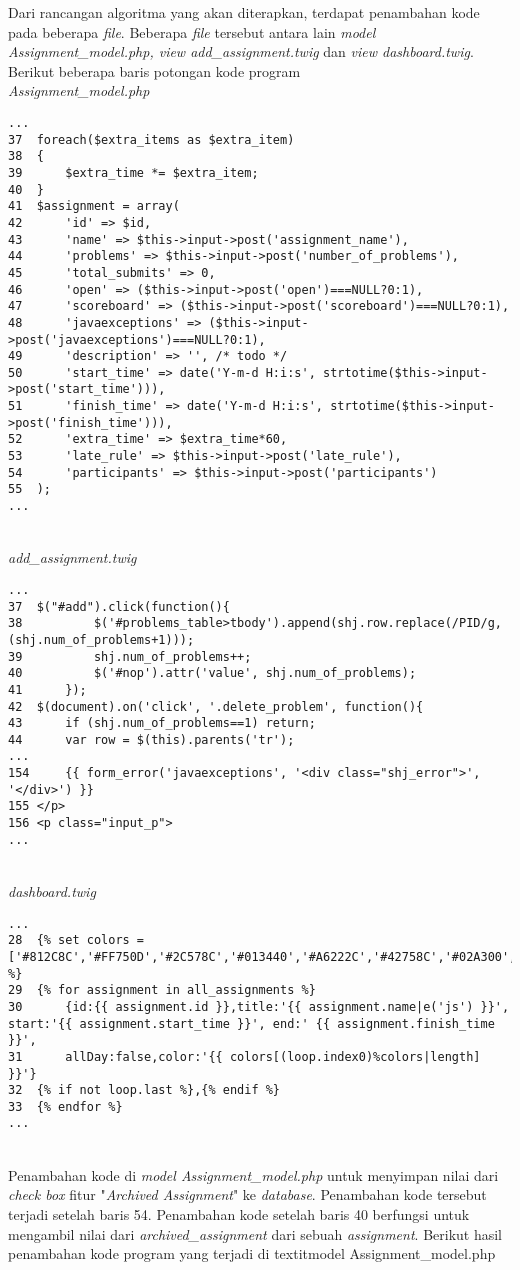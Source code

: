 Dari rancangan algoritma yang akan diterapkan, terdapat penambahan kode pada beberapa \textit{file}. Beberapa \textit{file} tersebut antara lain \textit{model Assignment\_model.php, view add\_assignment.twig} dan \textit{view dashboard.twig}.
Berikut beberapa baris potongan kode program
~\\
\textit{Assignment\_model.php}
\begin{lstlisting}[basicstyle=\ttfamily, frame=single,
columns=fullflexible, keepspaces=true, breaklines=true]
...
37	foreach($extra_items as $extra_item)
38	{
39		$extra_time *= $extra_item;
40	}
41	$assignment = array(
42		'id' => $id,
43		'name' => $this->input->post('assignment_name'),
44		'problems' => $this->input->post('number_of_problems'),
45		'total_submits' => 0,
46		'open' => ($this->input->post('open')===NULL?0:1),
47		'scoreboard' => ($this->input->post('scoreboard')===NULL?0:1),
48		'javaexceptions' => ($this->input->post('javaexceptions')===NULL?0:1),
49		'description' => '', /* todo */
50		'start_time' => date('Y-m-d H:i:s', strtotime($this->input->post('start_time'))),
51		'finish_time' => date('Y-m-d H:i:s', strtotime($this->input->post('finish_time'))),
52		'extra_time' => $extra_time*60,
53		'late_rule' => $this->input->post('late_rule'),
54		'participants' => $this->input->post('participants')
55	);
...
\end{lstlisting}
~\\
\textit{add\_assignment.twig}
\begin{lstlisting}[basicstyle=\ttfamily, frame=single,
columns=fullflexible, keepspaces=true, breaklines=true]
...
37	$("#add").click(function(){
38			$('#problems_table>tbody').append(shj.row.replace(/PID/g, (shj.num_of_problems+1)));
39			shj.num_of_problems++;
40			$('#nop').attr('value', shj.num_of_problems);
41		});
42	$(document).on('click', '.delete_problem', function(){
43		if (shj.num_of_problems==1) return;
44		var row = $(this).parents('tr');
...
154		{{ form_error('javaexceptions', '<div class="shj_error">', '</div>') }}
155	</p>
156	<p class="input_p">
...
\end{lstlisting}
~\\
\textit{dashboard.twig}
\begin{lstlisting}[basicstyle=\ttfamily, frame=single,
columns=fullflexible, keepspaces=true, breaklines=true]
...
28	{% set colors = ['#812C8C','#FF750D','#2C578C','#013440','#A6222C','#42758C','#02A300','#BA6900'] %}
29	{% for assignment in all_assignments %}
30		{id:{{ assignment.id }},title:'{{ assignment.name|e('js') }}', start:'{{ assignment.start_time }}', end:' {{ assignment.finish_time }}',
31		allDay:false,color:'{{ colors[(loop.index0)%colors|length] }}'}
32	{% if not loop.last %},{% endif %}
33	{% endfor %}
...
\end{lstlisting}
~\\
Penambahan kode di \textit{model Assignment\_model.php} untuk menyimpan nilai dari \textit{check box} fitur "\textit{Archived Assignment}" ke \textit{database}. Penambahan kode tersebut terjadi setelah baris 54. Penambahan kode setelah baris 40 berfungsi untuk mengambil nilai dari \textit{archived\_assignment} dari sebuah \textit{assignment}. Berikut hasil penambahan kode program yang terjadi di textit{model Assignment\_model.php} 

